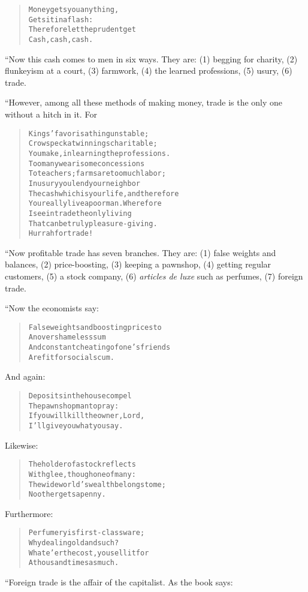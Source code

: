 \documentclass[article, twoside, 14pt]{memoir}
\renewenvironment{verbatim}{%
\begin{quote}%
\vskip -10pt%
\begin{alltt}\normalfont\large}{\end{alltt}%
\end{quote}%
\vskip -10pt
} %
\begin{document}
\begin{verbatim}
Money gets you anything,
    Gets it in a flash:
Therefore let the prudent get
    Cash, cash, cash.
\end{verbatim}
“Now this cash comes to men in six ways. They are: (1) begging for
charity, (2) flunkeyism at a court, (3) farmwork, (4) the learned
professions, (5) usury, (6) trade.

“However, among all these methods of making money, trade is the
only one without a hitch in it. For

\begin{verbatim}
Kings' favor is a thing unstable;
Crows peck at winnings charitable;
You make, in learning the professions.
Too many wearisome concessions
To teachers; farms are too much labor;
In usury you lend your neighbor
The cash which is your life, and therefore
You really live a poor man. Wherefore
I see in trade the only living
That can be truly pleasure-giving.
Hurrah for trade!
\end{verbatim}
“Now profitable trade has seven branches. They are: (1) false
weights and balances, (2) price-boosting, (3) keeping a pawnshop,
(4) getting regular customers, (5) a stock company, (6)
\emph{articles de luxe} such as perfumes, (7) foreign trade.

“Now the economists say:

\begin{verbatim}
False weights and boosting prices to
    An overshameless sum
And constant cheating of one's friends
    Are fit for social scum.
\end{verbatim}
And again:

\begin{verbatim}
Deposits in the house compel
    The pawnshop man to pray:
If you will kill the owner, Lord,
    I'll give you what you say.
\end{verbatim}
Likewise:

\begin{verbatim}
The holder of a stock reflects
    With glee, though one of many:
The wide world's wealth belongs to me;
    No other gets a penny.
\end{verbatim}
Furthermore:

\begin{verbatim}
Perfumery is first-class ware;
    Why deal in gold and such?
Whate'er the cost, you sell it for
    A thousand times as much.
\end{verbatim}
“Foreign trade is the affair of the capitalist. As the book says:
\end{document}
